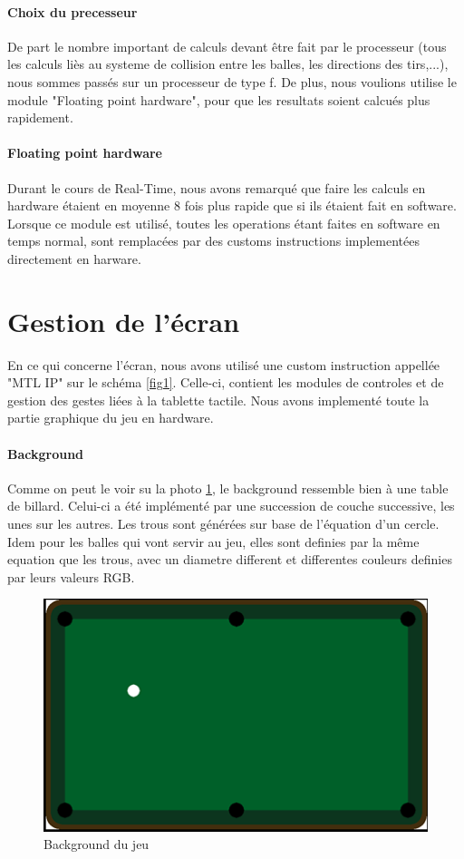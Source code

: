 \paragraph{Choix du precesseur}

De part le nombre important de calculs devant être fait par le processeur (tous les calculs liès au systeme de collision entre les balles, les directions des tirs,...), nous sommes passés sur un processeur de type f. De plus, nous voulions utilise le module "Floating point hardware", pour que les resultats soient calcués plus rapidement.

\paragraph{Floating point hardware}

Durant le cours de Real-Time, nous avons remarqué que faire les calculs en hardware étaient en moyenne 8 fois plus rapide que si ils étaient fait en software. Lorsque ce module est utilisé, toutes les operations étant faites en software en temps normal, sont remplacées par des customs instructions implementées directement en harware.

\section{Gestion de l'écran}

En ce qui concerne l'écran, nous avons utilisé une custom instruction appellée "MTL IP" sur le schéma \ref{fig1}. Celle-ci, contient les modules de controles et de gestion des gestes liées à la tablette tactile. Nous avons implementé toute la partie graphique du jeu en hardware.

\paragraph{Background}
Comme on peut le voir su la photo \ref{fig2}, le background ressemble bien à une  table de billard. Celui-ci a été implémenté par une succession de couche successive, les unes sur les autres. Les trous sont générées sur base de l'équation d'un cercle. Idem pour les balles qui vont servir au jeu, elles sont definies par la même equation que les trous, avec un diametre different et differentes couleurs definies par leurs valeurs RGB.

\begin{figure}[!ht]
\centering
\includegraphics[scale=0.75]{background.png}
\caption{Background du jeu}
\label{fig2}
\end{figure}

